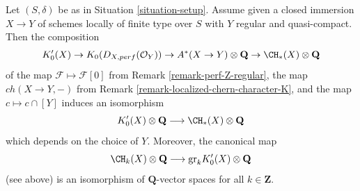 \begin{proposition}
\label{proposition-K-tensor-Q}
Let $(S, \delta)$ be as in Situation \ref{situation-setup}. Assume given a
closed immersion $X \to Y$ of schemes locally of finite type over $S$
with $Y$ regular and quasi-compact. Then the composition
$$
K'_0(X) \to
K_0(D_{X, perf}(\mathcal{O}_Y)) \to
A^*(X \to Y) \otimes \mathbf{Q} \to
\CH_*(X) \otimes \mathbf{Q}
$$
of the map $\mathcal{F} \mapsto \mathcal{F}[0]$ from
Remark \ref{remark-perf-Z-regular}, the map $ch(X \to Y, -)$ from
Remark \ref{remark-localized-chern-character-K}, and
the map $c \mapsto c \cap [Y]$ induces an isomorphism
$$
K'_0(X) \otimes \mathbf{Q}
\longrightarrow
\CH_*(X) \otimes \mathbf{Q}
$$
which depends on the choice of $Y$. Moreover, the canonical map
$$
\CH_k(X) \otimes \mathbf{Q}
\longrightarrow
\text{gr}_k K'_0(X) \otimes \mathbf{Q}
$$
(see above) is an isomorphism of $\mathbf{Q}$-vector spaces for all
$k \in \mathbf{Z}$.
\end{proposition}

